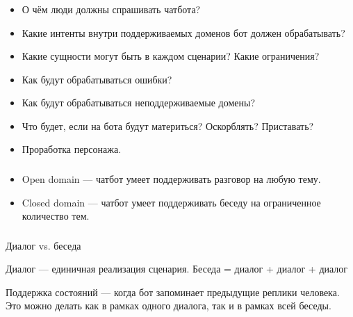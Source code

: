 \documentclass[t, 11pt]{beamer}
\begin{document}
	\begin{frame}
	\frametitle{\insertsection}
	\frametitle{\insertsubsection}
		\begin{itemize}
\item О чём люди должны спрашивать чатбота?
\item Какие интенты внутри поддерживаемых доменов бот должен
обрабатывать?
\item Какие сущности могут быть в каждом сценарии? Какие
ограничения?
\item Как будут обрабатываться ошибки?
\item Как будут обрабатываться неподдерживаемые домены?
\item Что будет, если на бота будут материться? Оскорблять? Приставать?
\item Проработка персонажа.
	\end{itemize}	
\end{frame}





\begin{frame}
	\frametitle{\insertsection}
	\frametitle{\insertsubsection}
	
	\begin{itemize}
		\item Open domain — чатбот умеет поддерживать разговор на любую
		тему.
		\item Closed domain — чатбот умеет поддерживать беседу на
		ограниченное количество тем. 
	\end{itemize}
	
\end{frame}





\begin{frame}
	\frametitle{\insertsection}
	\frametitle{\insertsubsection}
	

Диалог vs. беседа


Диалог — единичная реализация сценария.
Беседа = диалог + диалог + диалог


Поддержка состояний — когда бот запоминает предыдущие
реплики человека. Это можно делать как в рамках одного
диалога, так и в рамках всей беседы.

\end{frame}
\end{document}
